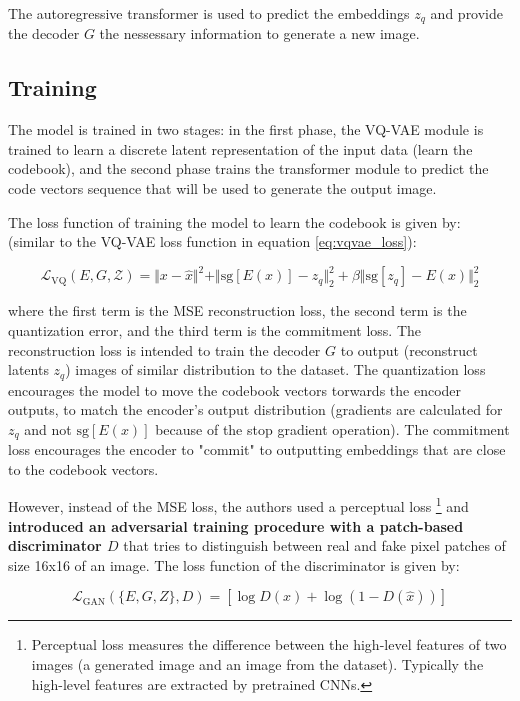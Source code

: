 The autoregressive transformer is used to predict the embeddings $z_q$ and provide the decoder $G$ the nessessary information to generate a new image.




\subsection{Training}

The model is trained in two stages: in the first phase, the VQ-VAE module is trained to learn a discrete latent representation of the input data (learn the codebook), and the second phase trains the transformer module to predict the code vectors sequence that will be used to generate the output image.

The loss function of training the model to learn the codebook is given by: (similar to the VQ-VAE loss function in equation \ref{eq:vqvae_loss}):

\begin{equation}
    \mathcal{L}_{\text{VQ}} (E, G, \mathcal{Z}) = \Vert x - \hat{x} \Vert ^2 + \Vert \text{sg}[E(x)] - z_q \Vert ^2_2 +  \beta \Vert \text{sg}[z_q] - E(x) \Vert ^2_2
\end{equation}

where the first term is the MSE reconstruction loss, the second term is the quantization error, and the third term is the commitment loss. The reconstruction loss is intended to train the decoder $G$ to output (reconstruct latents $z_q$) images of similar distribution to the dataset. The quantization loss encourages the model to move the codebook vectors torwards the encoder outputs, to match the encoder's output distribution (gradients are calculated for $z_q$ and not $\text{sg}[E(x)]$ because of the stop gradient operation). The commitment loss encourages the encoder to "commit" to outputting embeddings that are close to the codebook vectors.

However, instead of the MSE loss, the authors used a perceptual loss \footnote[3]{Perceptual loss measures the difference between the high-level features of two images (a generated image and an image from the dataset). Typically the high-level features are extracted by pretrained CNNs.} and \textbf{introduced an adversarial training procedure with a patch-based discriminator $D$} that tries to distinguish between real and fake pixel patches of size 16x16 of an image. The loss function of the discriminator is given by:

\begin{equation}
    \mathcal{L}_{\text{GAN}}(\{E,G,Z\}, D) = [\log D(x) + \log (1-D(\hat{x}))]
\end{equation}

